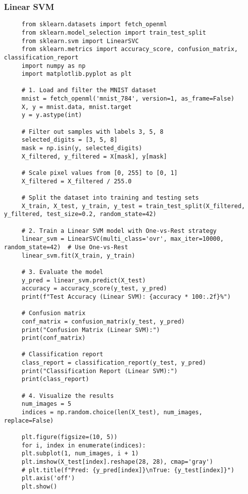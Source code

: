 \documentclass[letterpaper]{article}
\begin{document}
\subsubsection{Linear SVM}
\begin{lstlisting}
     from sklearn.datasets import fetch_openml
     from sklearn.model_selection import train_test_split
     from sklearn.svm import LinearSVC
     from sklearn.metrics import accuracy_score, confusion_matrix, classification_report
     import numpy as np
     import matplotlib.pyplot as plt
     
     # 1. Load and filter the MNIST dataset
     mnist = fetch_openml('mnist_784', version=1, as_frame=False)
     X, y = mnist.data, mnist.target
     y = y.astype(int)
     
     # Filter out samples with labels 3, 5, 8
     selected_digits = [3, 5, 8]
     mask = np.isin(y, selected_digits)
     X_filtered, y_filtered = X[mask], y[mask]
     
     # Scale pixel values from [0, 255] to [0, 1]
     X_filtered = X_filtered / 255.0
     
     # Split the dataset into training and testing sets
     X_train, X_test, y_train, y_test = train_test_split(X_filtered, y_filtered, test_size=0.2, random_state=42)
     
     # 2. Train a Linear SVM model with One-vs-Rest strategy
     linear_svm = LinearSVC(multi_class='ovr', max_iter=10000, random_state=42)  # Use One-vs-Rest
     linear_svm.fit(X_train, y_train)
     
     # 3. Evaluate the model
     y_pred = linear_svm.predict(X_test)
     accuracy = accuracy_score(y_test, y_pred)
     print(f"Test Accuracy (Linear SVM): {accuracy * 100:.2f}%")
     
     # Confusion matrix
     conf_matrix = confusion_matrix(y_test, y_pred)
     print("Confusion Matrix (Linear SVM):")
     print(conf_matrix)
     
     # Classification report
     class_report = classification_report(y_test, y_pred)
     print("Classification Report (Linear SVM):")
     print(class_report)
     
     # 4. Visualize the results
     num_images = 5
     indices = np.random.choice(len(X_test), num_images, replace=False)
     
     plt.figure(figsize=(10, 5))
     for i, index in enumerate(indices):
     plt.subplot(1, num_images, i + 1)
     plt.imshow(X_test[index].reshape(28, 28), cmap='gray')
     # plt.title(f"Pred: {y_pred[index]}\nTrue: {y_test[index]}")
     plt.axis('off')
     plt.show()
\end{lstlisting}
\end{document}
